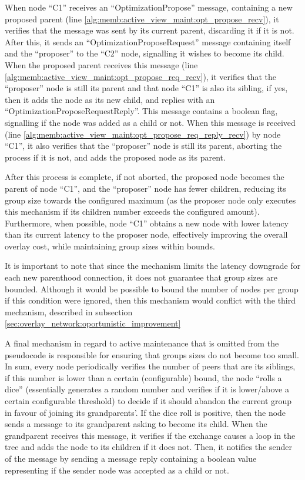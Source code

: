 When node ``C1'' receives an ``OptimizationPropose'' message, containing a new proposed parent (line \ref{alg:memb:active_view_maint:opt_propose_recv}), it verifies that the message was sent by its current parent, discarding it if it is not. After this, it sends an ``OptimizationProposeRequest'' message containing itself and the ``proposer'' to the ``C2'' node, signalling it wishes to become its child. When the proposed parent receives this message (line \ref{alg:memb:active_view_maint:opt_propose_req_recv}), it verifies that the ``proposer'' node is still its parent and that node ``C1'' is also its sibling, if yes, then it adds the node as its new child, and replies with an ``OptimizationProposeRequestReply''. This message contains a boolean flag, signalling if the node was added as a child or not. When this message is received (line \ref{alg:memb:active_view_maint:opt_propose_req_reply_recv}) by node ``C1'', it also verifies that the ``proposer'' node is still its parent, aborting the process if it is not, and adds the proposed node as its parent.

After this process is complete, if not aborted, the proposed node becomes the parent of node ``C1'', and the ``proposer'' node has fewer children, reducing its group size towards the configured maximum (as the proposer node only executes this mechanism if its children number exceeds the configured amount). Furthermore, when possible, node ``C1'' obtains a new node with lower latency than its current latency to the proposer node, effectively improving the overall overlay cost, while maintaining group sizes within bounds.

It is important to note that since the mechanism limits the latency downgrade for each new parenthood connection, it does not guarantee that group sizes are bounded. Although it would be possible to bound the number of nodes per group if this condition were ignored, then this mechanism would conflict with the third mechanism, described in subsection \ref{sec:overlay_network:oportunistic_improvement}

A final mechanism in regard to active maintenance that is omitted from the pseudocode is responsible for ensuring that groups sizes do not become too small. In sum, every node periodically verifies the number of peers that are its siblings, if this number is lower than a certain (configurable) bound, the node ``rolls a dice'' (essentially generates a random number and verifies if it is lower/above a certain configurable threshold) to decide if it should abandon the current group in favour of joining its grandparents'. If the dice roll is positive, then the node sends a message to its grandparent asking to become its child. When the grandparent receives this message, it verifies if the exchange causes a loop in the tree and adds the node to its children if it does not. Then, it notifies the sender of the message by sending a message reply containing a boolean value representing if the sender node was accepted as a child or not. 

